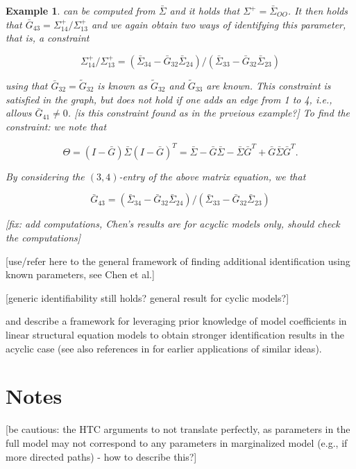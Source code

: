 \documentclass[accepted]{uai2021} %
\newtheorem{exmp}[thm]{Example}
\begin{document}
\begin{exmp}
	can be computed from $\bar{\Sigma}$ and it holds that 
	$\Sigma^+=\bar{\Sigma}_{OO}$. It then holds that $\bar{G}_{43} = 
	\Sigma_{14}^+/\Sigma_{13}^+$ and we again obtain two ways of identifying 
	this parameter, that is, a constraint
	
	$$
	\Sigma_{14}^+/\Sigma_{13}^+ = (\bar{\Sigma}_{34} - 
	\bar{G}_{32}\bar{\Sigma}_{24})/(\bar{\Sigma}_{33} - 
	\bar{G}_{32}\bar{\Sigma}_{23})
	$$
	
	using that $\bar{G}_{32} = \tilde{G}_{32}$ is known as $\tilde{G}_{32}$ and 
	$\tilde{G}_{33}$ are known. This constraint is satisfied in the graph, but 
	does not hold if one adds an edge from 1 to 
	4, i.e., allows $\bar{G}_{41} \neq 0$. [is this constraint found as in the 
	prveious example?]
	To find the constraint: we note that
	
	$$
	\Theta = (I - \bar{G})\bar{\Sigma}(I-\bar{G})^T = \bar{\Sigma} - 
	\bar{G}\bar{\Sigma} - \bar{\Sigma}\bar{G}^T + \bar{G}\bar{\Sigma}\bar{G}^T.
	$$
	
	By considering the $(3,4)$-entry of the above matrix equation, we that
	
	$$
	\bar{G}_{43} = (\bar{\Sigma}_{34} - 
	\bar{G}_{32}\bar{\Sigma}_{24})/(\bar{\Sigma}_{33} - 
	\bar{G}_{32}\bar{\Sigma}_{23})
	$$
	
	[fix: add computations, Chen's results are for acyclic models only, should 
	check the computations]
\end{exmp}

[use/refer here to the general framework of finding additional identification 
using known parameters, see Chen et al.]

[generic identifiability still holds? general result for cyclic models?]

\cite{chenIJCAI2016} and \cite{chenICML2017} describe a framework for 
leveraging prior knowledge of 
model coefficients in linear structural equation models to obtain stronger 
identification results in the acyclic case (see also references in 
\cite{chenICML2017} for earlier applications of similar ideas).


\section{Notes}

[be cautious: the HTC arguments to not translate perfectly, as parameters in 
the full model may not correspond to any parameters in marginalized model 
(e.g., if more directed paths) - how to describe this?]
\end{document}
